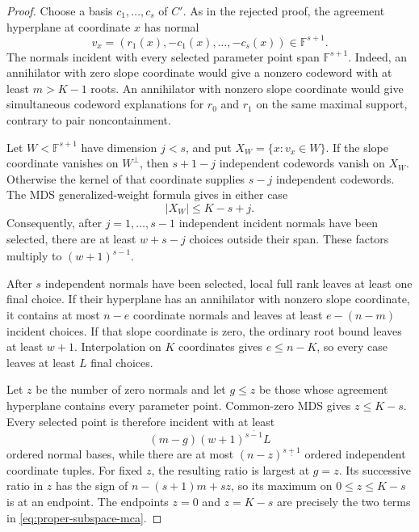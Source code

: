 \documentclass[11pt,a4paper]{amsart}
\numberwithin{equation}{section}
\theoremstyle{remark}
\newcommand{\F}{\mathbb F}\newcommand{\B}{\mathbb B}\newcommand{\K}{\mathbb K}\newcommand{\Z}{\mathbb Z}
\begin{document}
\begin{proof}
Choose a basis \(c_1,\ldots,c_s\) of \(C'\).  As in the rejected proof,
the agreement hyperplane at coordinate \(x\) has normal
\[
 v_x=(r_1(x),-c_1(x),\ldots,-c_s(x))\in\F^{s+1}.
\]
The normals incident with every selected parameter point span
\(\F^{s+1}\).  Indeed, an annihilator with zero slope coordinate would
give a nonzero codeword with at least \(m>K-1\) roots.  An annihilator with
nonzero slope coordinate would give simultaneous codeword explanations for
\(r_0\) and \(r_1\) on the same maximal support, contrary to
pair noncontainment.

Let \(W<\F^{s+1}\) have dimension \(j<s\), and put
\(X_W=\{x:v_x\in W\}\).  If the slope coordinate vanishes on
\(W^\perp\), then \(s+1-j\) independent codewords vanish on \(X_W\).
Otherwise the kernel of that coordinate supplies \(s-j\) independent
codewords.  The MDS generalized-weight formula gives in either case
\[
 |X_W|\le K-s+j.
\]
Consequently, after \(j=1,\ldots,s-1\) independent incident normals have
been selected, there are at least \(w+s-j\) choices outside their span.
These factors multiply to \((w+1)^{\overline{s-1}}\).

After \(s\) independent normals have been selected, local full rank leaves
at least one final choice.  If their hyperplane has an annihilator with
nonzero slope coordinate, it contains at most \(n-e\) coordinate normals
and leaves at least \(e-(n-m)\) incident choices.  If that slope coordinate
is zero, the ordinary root bound leaves at least \(w+1\).  Interpolation on
\(K\) coordinates gives \(e\le n-K\), so every case leaves at least \(L\)
final choices.

Let \(z\) be the number of zero normals and let \(g\le z\) be those whose
agreement hyperplane contains every parameter point.  Common-zero MDS gives
\(z\le K-s\).  Every selected point is therefore incident with at least
\[
 (m-g)(w+1)^{\overline{s-1}}L
\]
ordered normal bases, while there are at most
\((n-z)^{\underline{s+1}}\) ordered independent coordinate tuples.
For fixed \(z\), the resulting ratio is largest at \(g=z\).  Its successive
ratio in \(z\) has the sign of
\(n-(s+1)m+sz\), so its maximum on \(0\le z\le K-s\) is at an endpoint.
The endpoints \(z=0\) and \(z=K-s\) are precisely the two terms in
\eqref{eq:proper-subspace-mca}.
\end{proof}
\end{document}
